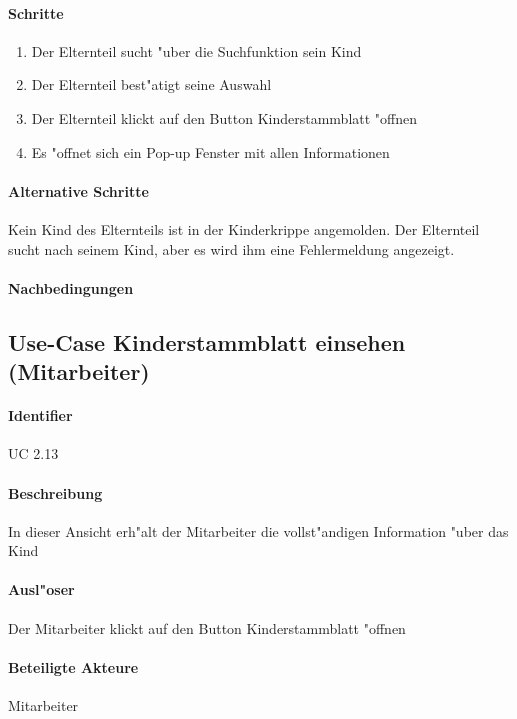 		\paragraph{Schritte}
		\begin{enumerate}
			\item Der Elternteil sucht "uber die Suchfunktion sein Kind
			\item Der Elternteil best"atigt seine Auswahl
			\item Der Elternteil klickt auf den Button \dq Kinderstammblatt "offnen\dq
			\item Es "offnet sich ein Pop-up Fenster mit allen Informationen
		\end{enumerate}
		
		\paragraph{Alternative Schritte}
		Kein Kind des Elternteils ist in der Kinderkrippe angemolden. Der Elternteil sucht nach seinem Kind, aber es wird ihm eine Fehlermeldung angezeigt. 
		\paragraph{Nachbedingungen}
	  
    
  
  
  \newpage
 \subsection{Use-Case Kinderstammblatt einsehen (Mitarbeiter)}
  \paragraph{Identifier}
  UC 2.13
  \paragraph{Beschreibung}
  In dieser Ansicht erh"alt der Mitarbeiter die vollst"andigen Information "uber das Kind
  \paragraph{Ausl"oser}
  Der Mitarbeiter klickt auf den Button \dq Kinderstammblatt "offnen\dq
  \paragraph{Beteiligte Akteure}   \leavevmode \newline
    Mitarbeiter
